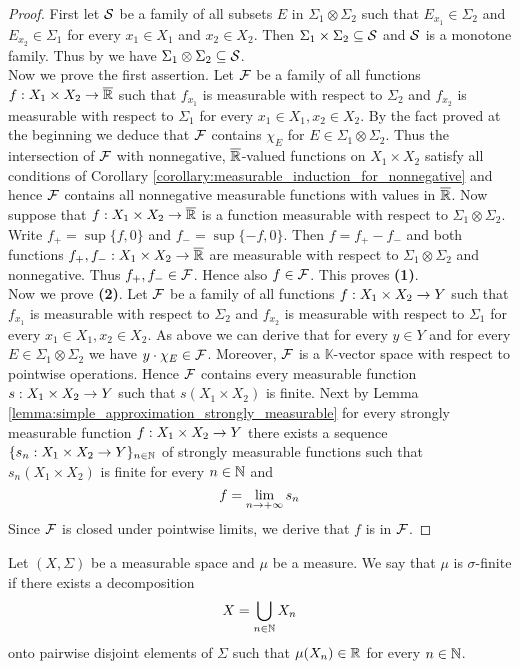 \begin{proof}
First let ${\mathcal S}$ be a family of all subsets $E$ in $\Sigma_1\otimes \Sigma_2$ such that $E_{x_1}\in \Sigma_2$ and $E_{x_2}\in \Sigma_1$ for every $x_1\in X_1$ and $x_2\in X_2$. Then $\Sigma_1\times \Sigma_2\subseteq {\mathcal S}$ and ${\mathcal S}$ is a monotone family. Thus by {\cite[Theorem 1.5]{Introduction_to_measure_theory}} we have $\Sigma_1\otimes \Sigma_2\subseteq {\mathcal S}$.\\
Now we prove the first assertion. Let ${\mathcal F}$ be a family of all functions $f:X_1\times X_2\rightarrow \overline{{\mathbb R}}$ such that $f_{x_1}$ is measurable with respect to $\Sigma_2$ and $f_{x_2}$ is measurable with respect to $\Sigma_1$ for every $x_1\in X_1,x_2\in X_2$. By the fact proved at the beginning we deduce that ${\mathcal F}$ contains $\chi_E$ for $E\in \Sigma_1\otimes \Sigma_2$. Thus the intersection of ${\mathcal F}$ with nonnegative, $\overline{{\mathbb R}}$-valued functions on $X_1\times X_2$ satisfy all conditions of Corollary \ref{corollary:measurable_induction_for_nonnegative} and hence ${\mathcal F}$ contains all nonnegative measurable functions with values in $\overline{{\mathbb R}}$. Now suppose that $f:X_1\times X_2\rightarrow \overline{{\mathbb R}}$ is a function measurable with respect to $\Sigma_1\otimes \Sigma_2$. Write $f_+ = \sup\{f, 0\}$ and $f_- = \sup\{-f, 0\}$. Then $f = f_+ - f_-$ and both functions $f_+,f_-:X_1\times X_2\rightarrow \overline{{\mathbb R}}$ are measurable with respect to $\Sigma_1\otimes \Sigma_2$ and nonnegative. Thus $f_+,f_-\in {\mathcal F}$. Hence also $f\in {\mathcal F}$. This proves \textbf{(1)}.\\
Now we prove \textbf{(2)}. Let ${\mathcal F}$ be a family of all functions $f:X_1\times X_2\rightarrow Y$ such that $f_{x_1}$ is measurable with respect to $\Sigma_2$ and $f_{x_2}$ is measurable with respect to $\Sigma_1$ for every $x_1\in X_1,x_2\in X_2$. As above we can derive that for every $y\in Y$ and for every $E\in \Sigma_1\otimes \Sigma_2$ we have $y\cdot \chi_E\in {\mathcal F}$. Moreover, ${\mathcal F}$ is a $\mathbb{K}$-vector space with respect to pointwise operations. Hence ${\mathcal F}$ contains every measurable function $s:X_1\times X_2\rightarrow Y$ such that $s(X_1\times X_2)$ is finite. Next by Lemma \ref{lemma:simple_approximation_strongly_measurable} for every strongly measurable function $f:X_1\times X_2\rightarrow Y$ there exists a sequence $\{s_n:X_1\times X_2\rightarrow Y\}_{n\in {\mathbb N}}$ of strongly measurable functions such that $s_n(X_1\times X_2)$ is finite for every $n\in {\mathbb N}$ and
$$f = \lim_{n\rightarrow +\infty}s_n$$
Since ${\mathcal F}$ is closed under pointwise limits, we derive that $f$ is in ${\mathcal F}$.
\end{proof}

\begin{definition}
Let $(X,\Sigma)$ be a measurable space and $\mu$ be a measure. We say that $\mu$ is $\sigma$-finite if there exists a decomposition
$$X = \bigcup_{n\in {\mathbb N}}X_n$$
onto pairwise disjoint elements of $\Sigma$ such that $\mu(X_n)\in {\mathbb R}$ for every $n\in {\mathbb N}$.
\end{definition}

